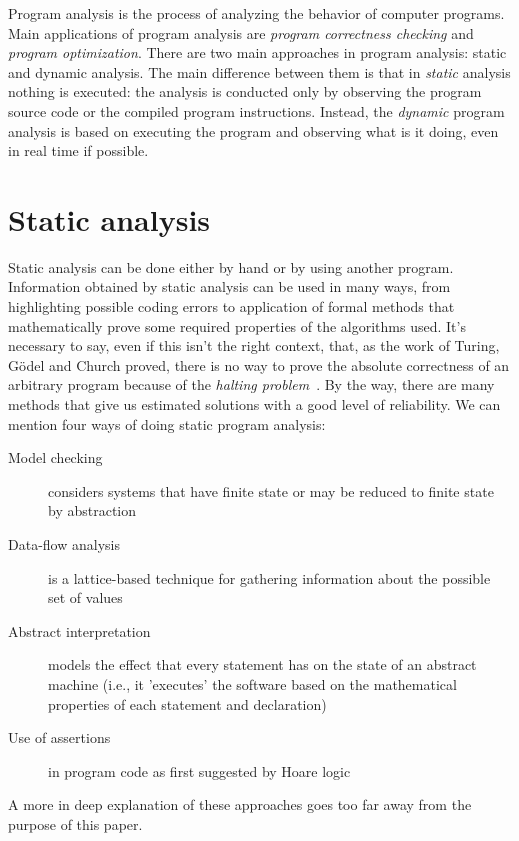\documentclass[a4paper,11pt]{report}
\begin{document}
Program analysis is the process of analyzing the behavior of computer
programs. Main applications of program analysis are 
\emph{program correctness checking} and \emph{program optimization}.
There are two main approaches in program analysis: static and dynamic analysis.
The main difference between them is that in \emph{static} analysis nothing is
executed: the analysis is conducted only by observing the program source code or
the compiled program instructions. Instead, the \emph{dynamic} program analysis
is based on executing the program and observing what is it doing, even in real
time if possible.

\section{Static analysis}

Static analysis can be done either by hand or by using another program.
Information obtained by static analysis can be used in many ways, from
highlighting possible coding errors to application of formal methods that
mathematically prove some required properties of the algorithms used. It's
necessary to say, even if this isn't the right context, that, as the work of
Turing, G\"{o}del and Church proved, there is no way to prove the absolute
correctness of an arbitrary program because of the \emph{halting
problem}~\cite{Turing01}.
By the way, there are many methods that give us estimated solutions with a
good level of reliability. We can mention four ways of doing static program
analysis:


\begin{description}
\item[Model checking] considers systems that have finite state or may be reduced to finite state by abstraction
\item[Data-flow analysis] is a lattice-based technique for gathering information about the possible set of values
\item[Abstract interpretation] models the effect that every statement has on the
state of an abstract machine (i.e., it 'executes' the software based on the
mathematical properties of each statement and declaration)
\item[Use of assertions] in program code as first suggested by Hoare
logic~\cite{Hoare01}
\end{description}

A more in deep explanation of these approaches goes too far away from the purpose of this paper.
\end{document}

